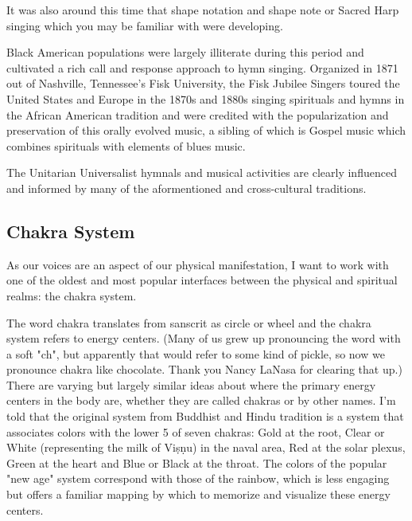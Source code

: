\documentclass[12pt]{article}
\begin{document}
It was also around this time that shape notation and shape note or Sacred Harp singing which you may be familiar with were developing.

Black American populations were largely illiterate during this period and cultivated a rich call and response approach to hymn singing. Organized in 1871 out of Nashville, Tennessee's Fisk University, the Fisk Jubilee Singers toured the United States and Europe in the 1870s and 1880s singing spirituals and hymns in the African American tradition and were credited with the popularization and preservation of this orally evolved music, a sibling of which is Gospel music which combines spirituals with elements of blues music.

The Unitarian Universalist hymnals and musical activities are clearly influenced and informed by many of the aformentioned and cross-cultural traditions.

\subsection*{Chakra System}

As our voices are an aspect of our physical manifestation, I want to work with one of the oldest and most popular interfaces between the physical and spiritual realms: the chakra system.

The word chakra translates from sanscrit as circle or wheel and the chakra system refers to energy centers. (Many of us grew up pronouncing the word with a soft "ch", but apparently that would refer to some kind of pickle, so now we pronounce chakra like chocolate. Thank you Nancy LaNasa for clearing that up.) There are varying but largely similar ideas about where the primary energy centers in the body are, whether they are called chakras or by other names. I'm told that the original system from Buddhist and Hindu tradition is a system that associates colors with the lower 5 of seven chakras: Gold at the root, Clear or White (representing the milk of Viṣṇu) in the naval area, Red at the solar plexus, Green at the heart and Blue or Black at the throat. The colors of the popular "new age" system correspond with those of the rainbow, which is less engaging but offers a familiar mapping by which to memorize and visualize these energy centers.
\end{document}
